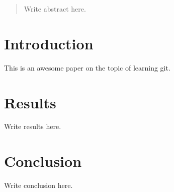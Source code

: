 \documentclass{article}
\begin{document}
\begin{abstract}
Write abstract here.
\end{abstract}

\section{Introduction}

This is an awesome paper on the topic of learning git.

\section{Results}

Write results here.

\section{Conclusion}

Write conclusion here.
\end{document}
